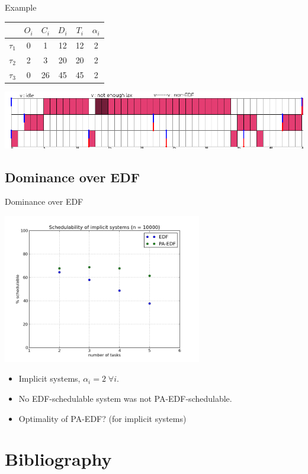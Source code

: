 \documentclass{beamer}
\begin{document}
\begin{frame}{Example}

        \begin{center}
            \begin{tabular}{|r|c|c|c|c|c|}
                \hline
                            & $O_i$ & $C_i$ & $D_i$ & $T_i$ & $\alpha_i$ \\ \hline
                $\tau_1$    & 0     & 1     & 12    & 12    & 2     \\ \hline
                $\tau_2$    & 2     & 3     & 20    & 20    & 2     \\ \hline
                $\tau_3$    & 0     & 26    & 45    & 45    & 2     \\ \hline
            \end{tabular}
        \end{center}

        \includegraphics[width=1\textwidth]{figs/PAEDF_example.png}

\end{frame}

\subsection{Dominance over EDF}

\begin{frame}{Dominance over EDF}
    \begin{center}
        \includegraphics[width=0.65\textwidth]{figs/ptedf_dominance.png}
    \end{center}
    \begin{itemize}
        \item Implicit systems, $\alpha_i = 2 \; \forall i$.
        \item No EDF-schedulable system was not PA-EDF-schedulable.
        \item Optimality of PA-EDF? (for implicit systems)
    \end{itemize}
\end{frame}

\section{Bibliography}
\end{document}
